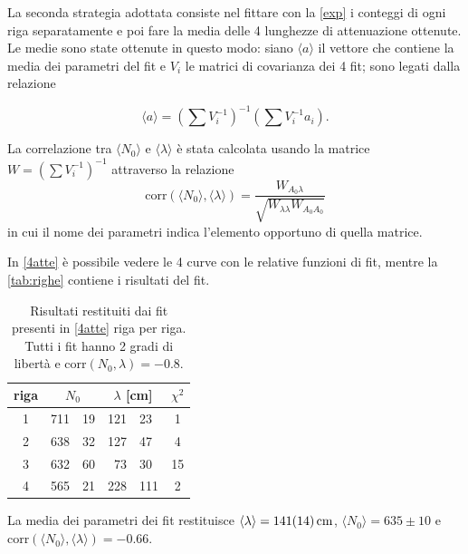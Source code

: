 La seconda strategia adottata consiste nel fittare con la \eqref{exp} i conteggi di ogni riga separatamente e poi fare la media delle 4 lunghezze di attenuazione ottenute.
Le medie sono state ottenute in questo modo: siano $\langle a \rangle$ il vettore che contiene la media dei parametri del fit e $V_i$ le matrici di covarianza dei 4 fit; sono legati dalla relazione 

\begin{equation*}
\langle a \rangle = \left(\sum{V_i^{-1}} \right)^{-1}  \left(\sum{V_i^{-1} a_i} \right).
\end{equation*}

La correlazione tra $\langle N_0 \rangle$ e $\langle \lambda \rangle$ è stata calcolata usando la matrice $W=\left(\sum{V_i^{-1}} \right)^{-1}$ attraverso la relazione
\begin{equation*}
\text{corr}(\langle N_0 \rangle ,\langle \lambda \rangle)=\frac{W_{A_0 \lambda}}{\sqrt{ W_{\lambda \lambda} W_{A_0 A_0}}}
\end{equation*}
in cui il nome dei parametri indica l'elemento opportuno di quella matrice.

In \autoref{4atte} è possibile vedere le 4 curve con le relative funzioni di fit, mentre la \autoref{tab:righe} contiene i risultati del fit.

\begin{table}[h]
\centering
\begin{tabular}{| c | r @{$\,\pm\,$} l  | r @{$\,\pm\,$} l  | c |}
\hline
riga & \multicolumn{2}{c|}{$N_0$} & \multicolumn{2}{c|}{ $\lambda$ [\si{cm}] } & $\chi^2$  \\
\hline
1 & 711&19 & 121&23 & 1  \\
2 & 638&32 & 127&47 & 4 \\
3 & 632&60 & 73&30 & 15 \\
4 & 565&21 & 228&111 & 2 \\
\hline
\end{tabular}
\caption{Risultati restituiti dai fit presenti in \autoref{4atte} riga per riga. Tutti i fit hanno 2 gradi di libertà e corr$(N_0,\lambda)=-0.8$. }
\label{tab:righe}
\end{table}


La media dei parametri dei fit restituisce $\langle\lambda\rangle=\SI{141\pm14}{cm}$, $\langle N_0\rangle=635\pm10$ e corr$(\langle N_0 \rangle ,\langle \lambda \rangle)=-0.66$.

